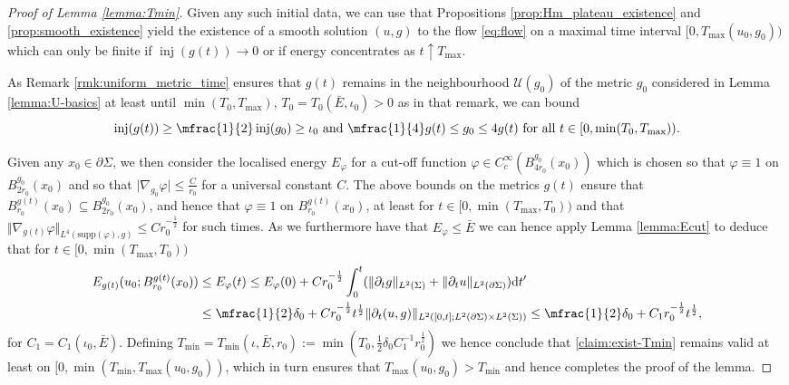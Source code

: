 \documentclass[10pt,reqno]{amsart}
\theoremstyle{plain}
\theoremstyle{definition}
\numberwithin{equation}{section}
\newcommand{\de}{\delta}
\newcommand{\Si}{\Sigma}
\newcommand{\vph}{\varphi}
\newcommand{\vphi}{\varphi}
\newcommand{\upto}{\uparrow}
\DeclareMathOperator{\inj}{inj}
\newcommand{\norm}[1]{\Vert#1\Vert}
\newcommand{\half}{\frac{1}{2}}
\newcommand{\mhalf}{\mfrac{1}{2}}
\newcommand{\dd}{\mathrm{d}} %
\newcommand{\pt}{\partial_t}
\newcommand{\abs}[1]{\vert#1\vert}
\newcommand{\pSi}{{\partial \Sigma}}
\newcommand{\UU}{{\mathcal U}}
\newcommand{\supp}{\text{supp}}
\newcommand{\hf}{\frac{1}{2}} %
\newcommand{\p}{\partial} %
\newcommand{\subs}{\subseteq} %
\begin{document}
\begin{proof}[Proof of Lemma \ref{lemma:Tmin}]
    Given any such initial data, we can use that Propositions \ref{prop:Hm_plateau_existence} and \ref{prop:smooth_existence} yield the existence of a smooth solution $(u,g)$ to the flow \eqref{eq:flow} on a maximal time interval $[0,T_{\max}(u_0,g_0))$ which can only be finite if  $\inj(g(t))\to 0$ or if energy concentrates as $t\upto T_{\max}$.  
	
    As Remark \ref{rmk:uniform_metric_time} ensures that $g(t)$ remains in the neighbourhood $\UU(g_0)$  of the metric $g_0$  considered in Lemma \ref{lemma:U-basics} at least until $\min(T_0,T_{\max})$, $T_0=T_0(\bar E,\iota_0)>0$ as in that remark, we can bound
    $$\inj(g(t))\geq  \mhalf\inj(g_0)\geq \iota_0 \text{ and } \mfrac{1}{4}g(t) \leq g_0 \leq 4g(t) \text{ for all } t \in [0,\min(T_0,T_{\max})).$$

    Given any $x_0 \in \p\Si$, we  then consider the localised energy $E_\vph$ for a cut-off function $\vph\in C_c^\infty( B_{4r_0}^{g_0}(x_0))$ which is chosen so that  $\vph\equiv 1$ on $B_{2 r_0}^{g_0}(x_0)$ and so that $\abs{\nabla_{g_0} \vph} \leq \frac{C}{r_0}$ for a universal constant $C$. The above bounds on the metrics $g(t)$ ensure that $B_{r_0}^{g(t)}(x_0) \subs B_{2 r_0}^{g_0}(x_0)$, and hence that $\vph\equiv 1 $ on $B_{r_0}^{g(t)}(x_0)$, at least for $t\in [0,\min(T_{\max},T_0))$ and that $\norm{\nabla_{g(t)} \vph}_{L^4(\supp(\vph),g)} \leq Cr_0^{-\hf}$  for such times. As we furthermore have that $E_\vphi\leq \bar E$ we can hence apply Lemma \ref{lemma:Ecut} to deduce that for $t\in [0, \min(T_{\max},T_0))$
    \begin{align*}
    	E_{g(t)}(u_0; B_{r_0}^{g(t)}(x_0)) &\leq E_{\vph}(t)\leq E_{\vph}(0) + Cr_0^{-\half}\int_0^t ( \norm{\pt g}_{L^2(\Si)} + \norm{\p_t u}_{L^2(\p\Si)}) \dd t'\\
    	&\leq \mhalf \de_0 + Cr_0^{-\half} t^\hf  \norm{\pt (u,g) }_{L^2([0,t];L^2(\pSi)\times L^2(\Si))} %
    	\leq \mhalf \de_0 + C_1 r_0^{-\half} t^\hf ,
    \end{align*}
    for $C_1=C_1(\iota_0,\bar E)$. Defining $T_{\min}=T_{\min}(\iota,\bar E,r_0):=\min(T_0,\half \de_0 C_1^{-1}r_0^{\half})$ we hence conclude that \eqref{claim:exist-Tmin} remains valid at least on $[0,\min(T_{\min},T_{\max}(u_0,g_0))$, which in turn ensures that $T_{\max}(u_0,g_0)>T_{\min}$ and hence completes the proof of the lemma. 
\end{proof}
\end{document}
